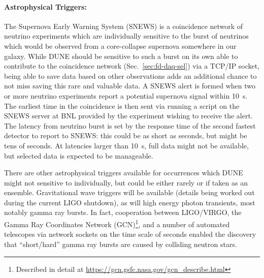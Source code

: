 \paragraph{Astrophysical Triggers:} The Supernova Early Warning System
(SNEWS) is a coincidence network of neutrino experiments which are
individually sensitive to the burst of neutrinos which would be
observed from a core-collapse supernova somewhere in our galaxy.
While DUNE should be sensitive to such a burst on its own able to
contribute to the coincidence network (Sec.~\ref{sec:fd-daq-sel}) via
a TCP/IP socket, being able to save data based on other observations
adds an additional chance to not miss saving this rare and valuable
data.
A SNEWS alert is formed when two or more neutrino experiments report a
potential supernova signal within \SI{10}{\s}.
The earliest time in the coincidence is then sent via running a script
on the SNEWS server at BNL provided by the experiment wishing to
receive the alert.
The latency from neutrino burst is set by the response time of the
second fastest detector to report to SNEWS: this could be as short as
seconds, but might be tens of seconds.
At latencies larger than \SI{10}{\s}, full data might not be
available, but selected data is expected to be manageable.

There are other astrophysical triggers available for occurrences which
DUNE might not sensitive to individually, but could be either rarely
or if taken as an ensemble.
Gravitational wave triggers will be available (details being worked
out during the current LIGO shutdown), as will high energy photon
transients, most notably gamma ray bursts.
In fact, cooperation between LIGO/VIRGO, the Gamma Ray Coordinates
Network (GCN)\footnote{Described in detail at
  \url{https://gcn.gsfc.nasa.gov/gcn_describe.html}}, and a number of
automated telescopes via network sockets on the time scale of seconds
enabled the discovery that ``short/hard'' gamma ray bursts are caused
by colliding neutron stars\cite{kilonova}.
